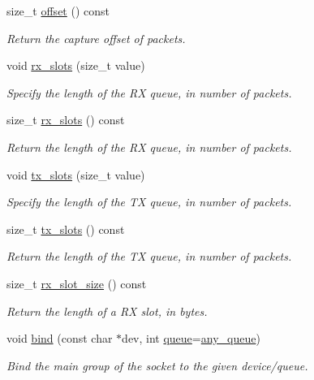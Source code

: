 \begin{DoxyCompactItemize}
size\-\_\-t \hyperlink{classnet_1_1pfq_ad419e5ef48bb5f9639c798b3d2dd1660}{offset} () const 
\begin{DoxyCompactList}\small\item\em Return the capture offset of packets. \end{DoxyCompactList}\item 
void \hyperlink{classnet_1_1pfq_a878c768492c68fc572a994a58913a3db}{rx\-\_\-slots} (size\-\_\-t value)
\begin{DoxyCompactList}\small\item\em Specify the length of the R\-X queue, in number of packets. \end{DoxyCompactList}\item 
size\-\_\-t \hyperlink{classnet_1_1pfq_aa4382e74b5975f81e5b5f676ed0177bb}{rx\-\_\-slots} () const 
\begin{DoxyCompactList}\small\item\em Return the length of the R\-X queue, in number of packets. \end{DoxyCompactList}\item 
void \hyperlink{classnet_1_1pfq_aae98015b961c6210081fa29a2ea34da2}{tx\-\_\-slots} (size\-\_\-t value)
\begin{DoxyCompactList}\small\item\em Specify the length of the T\-X queue, in number of packets. \end{DoxyCompactList}\item 
size\-\_\-t \hyperlink{classnet_1_1pfq_aea6852bcf02bf2430a6a7fe25131c4ab}{tx\-\_\-slots} () const 
\begin{DoxyCompactList}\small\item\em Return the length of the T\-X queue, in number of packets. \end{DoxyCompactList}\item 
size\-\_\-t \hyperlink{classnet_1_1pfq_a8616d3cd53f1a49ff347cc4599e7c04c}{rx\-\_\-slot\-\_\-size} () const 
\begin{DoxyCompactList}\small\item\em Return the length of a R\-X slot, in bytes. \end{DoxyCompactList}\item 
void \hyperlink{classnet_1_1pfq_a3e55b38d9f094ab88c3510c91a3c8ac5}{bind} (const char $\ast$dev, int \hyperlink{classnet_1_1queue}{queue}=\hyperlink{classnet_1_1pfq_a0d4eca6d0925b7c49365675c9cf9385c}{any\-\_\-queue})
\begin{DoxyCompactList}\small\item\em Bind the main group of the socket to the given device/queue. \end{DoxyCompactList}\item 

\end{DoxyCompactItemize}

